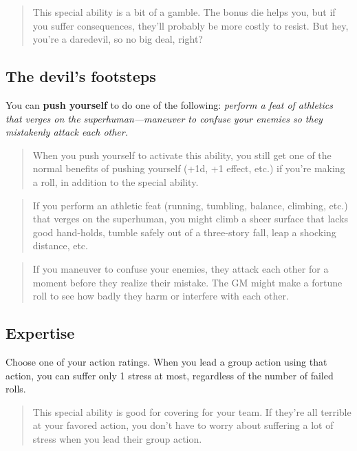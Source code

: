 \documentclass[11pt,fleqn,a5paper]{book}
\begin{document}
\begin{quote}
	This special ability is a bit of a gamble. The bonus die helps you, but if you suffer consequences, they’ll probably be more costly to resist. But hey, you’re a daredevil, so no big deal, right?
\end{quote} 

\subsection{The devil’s footsteps}

You can \textbf{push yourself} to do one of the following: \emph{perform a feat of athletics that verges on the superhuman---maneuver to confuse your enemies so they mistakenly attack each other.}

\begin{quote}
	When you push yourself to activate this ability, you still get one of the normal benefits of pushing yourself (+1d, +1 effect, etc.) if you’re making a roll, in addition to the special ability.
\end{quote} 

\begin{quote}
	If you perform an athletic feat (running, tumbling, balance, climbing, etc.) that verges on the superhuman, you might climb a sheer surface that lacks good hand-holds, tumble safely out of a three-story fall, leap a shocking distance, etc.
\end{quote} 

\begin{quote}
	If you maneuver to confuse your enemies, they attack each other for a moment before they realize their mistake. The GM might make a fortune roll to see how badly they harm or interfere with each other.
\end{quote} 

\subsection{Expertise}

Choose one of your action ratings. When you lead a group action using that action, you can suffer only 1 stress at most, regardless of the number of failed rolls.

\begin{quote}
	This special ability is good for covering for your team. If they’re all terrible at your favored action, you don’t have to worry about suffering a lot of stress when you lead their group action.
\end{quote} 
\end{document}
